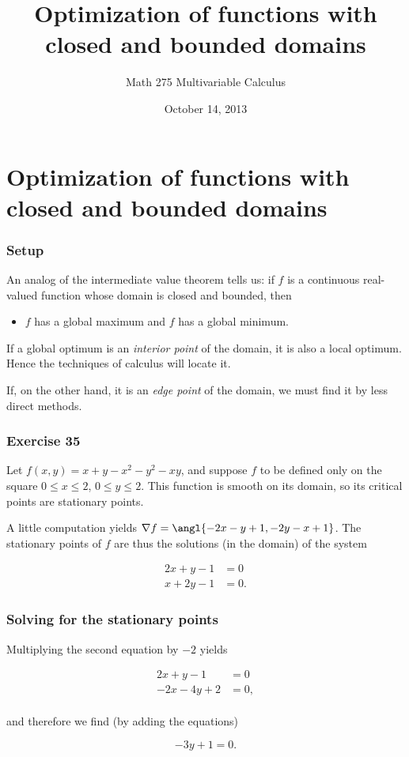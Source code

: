 \documentclass[%
  11pt,%
  ignorenonframetext,%
  xcolor={svgnames},%
  aspectratio=169%
]{beamer}
\title{Optimization of functions with closed and bounded domains}
\author{Math 275 Multivariable Calculus}
\date{October 14, 2013}
\begin{document}
\frame{\titlepage}

\section{Optimization of functions with closed and bounded domains}

\begin{frame}\frametitle{Setup}

An analog of the intermediate value theorem tells us: if $f$ is a
continuous real-valued function whose domain is closed and bounded, then

\begin{itemize}

\item
  $f$ has a global maximum and $f$ has a global minimum.
\end{itemize}

If a global optimum is an \emph{interior point} of the domain, it is
also a local optimum. Hence the techniques of calculus will locate it.

If, on the other hand, it is an \emph{edge point} of the domain, we must
find it by less direct methods.

\end{frame}

\begin{frame}\frametitle{Exercise 35}

Let $f(x,y) = x + y - x^2 - y^2 - xy$, and suppose $f$ to be defined
only on the square $0 \leq x \leq 2$, $0 \leq y \leq 2$. This function
is smooth on its domain, so its critical points are stationary points.

A little computation yields
$\nabla f = \angl{-2x - y + 1, -2y - x + 1}$. The stationary points of
$f$ are thus the solutions (in the domain) of the system

\begin{align*}
    2x + y - 1 &= 0 \\
    x + 2y - 1 &= 0.
\end{align*}

\end{frame}

\begin{frame}\frametitle{Solving for the stationary points}

Multiplying the second equation by $-2$ yields

\begin{align*}
    2x + y - 1 &= 0 \\
    -2x - 4y + 2 &= 0, \\
\end{align*}

and therefore we find (by adding the equations)

\begin{equation*}
    -3y + 1 = 0.
\end{equation*}

\end{frame}
\end{document}
